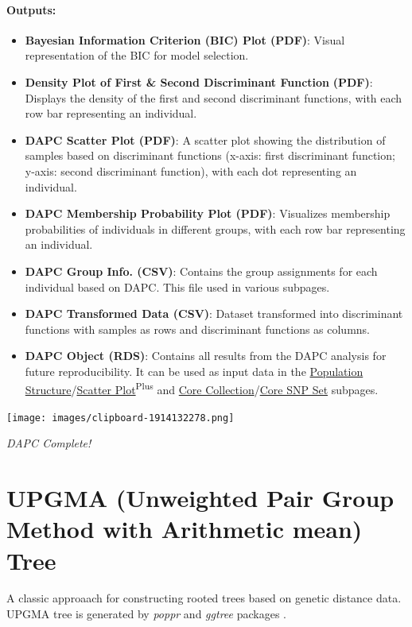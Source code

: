 \documentclass[
]{book}
\begin{document}
\paragraph*{Outputs:}\label{outputs-6}

\begin{itemize}
\item
  \textbf{Bayesian Information Criterion (BIC) Plot (PDF)}: Visual representation of the BIC for model selection.
\item
  \textbf{Density Plot of First \& Second Discriminant Function} \textbf{(PDF)}: Displays the density of the first and second discriminant functions, with each row bar representing an individual.
\item
  \textbf{DAPC Scatter Plot (PDF)}: A scatter plot showing the distribution of samples based on discriminant functions (x-axis: first discriminant function; y-axis: second discriminant function), with each dot representing an individual.
\item
  \textbf{DAPC Membership Probability Plot (PDF)}: Visualizes membership probabilities of individuals in different groups, with each row bar representing an individual.
\item
  \textbf{DAPC Group Info. (CSV)}: Contains the group assignments for each individual based on DAPC. This file used in various subpages.
\item
  \textbf{DAPC Transformed Data (CSV)}: Dataset transformed into discriminant functions with samples as rows and discriminant functions as columns.
\item
  \textbf{DAPC Object (RDS)}: Contains all results from the DAPC analysis for future reproducibility. It can be used as input data in the \ul{Population Structure}/\ul{Scatter Plot}\textsuperscript{Plus} and \ul{Core Collection}/\ul{Core SNP Set} subpages.
\end{itemize}

\texttt{[image: images/clipboard-1914132278.png]}

\emph{DAPC Complete!}

\section{UPGMA (Unweighted Pair Group Method with Arithmetic mean) Tree}\label{upgma-unweighted-pair-group-method-with-arithmetic-mean-tree}

A classic approaach for constructing rooted trees based on genetic distance data. UPGMA tree is generated by \emph{poppr} and \emph{ggtree} packages \citep{yu2016, kamvar2014}.
\end{document}
